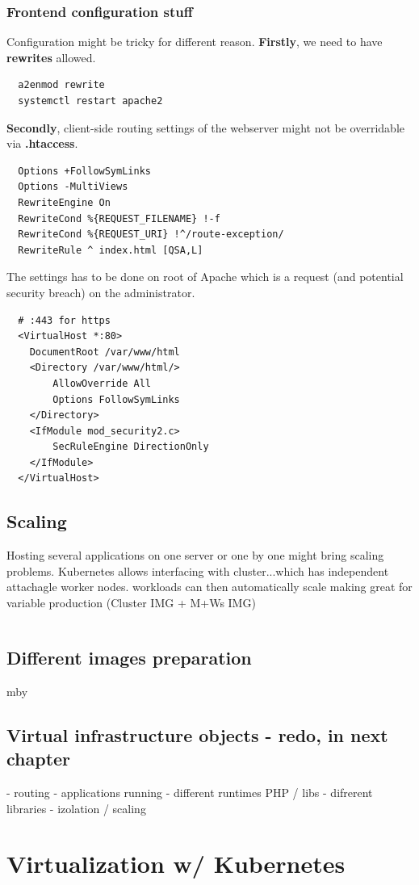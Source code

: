 \documentclass{article}
\begin{document}
\subsubsection{Frontend configuration stuff}
Configuration might be tricky for different reason. \textbf{Firstly}, we need to have \textbf{rewrites} allowed.
\begin{lstlisting}
  a2enmod rewrite
  systemctl restart apache2
\end{lstlisting}
\textbf{Secondly}, client-side routing settings of the webserver might not be overridable via \textbf{.htaccess}.  
\begin{lstlisting}
  Options +FollowSymLinks
  Options -MultiViews
  RewriteEngine On
  RewriteCond %{REQUEST_FILENAME} !-f
  RewriteCond %{REQUEST_URI} !^/route-exception/
  RewriteRule ^ index.html [QSA,L]
\end{lstlisting}
The settings has to be done on root of Apache which is a request (and potential security breach) on the administrator.
\begin{lstlisting}
  # :443 for https
  <VirtualHost *:80>
    DocumentRoot /var/www/html
    <Directory /var/www/html/>
        AllowOverride All
        Options FollowSymLinks
    </Directory>
    <IfModule mod_security2.c>
        SecRuleEngine DirectionOnly
    </IfModule>
  </VirtualHost>	
\end{lstlisting}
\subsection{Scaling}
Hosting several applications on one server or one by one might bring scaling problems. Kubernetes allows interfacing with cluster...which has independent attachagle worker nodes. workloads can then automatically scale making great for variable production (Cluster IMG + M+Ws IMG)
\begin{lstlisting}

\end{lstlisting}
\subsection{Different images preparation}
mby
\subsection{Virtual infrastructure objects - redo, in next chapter}
- routing
- applications running
- different runtimes PHP / libs
- difrerent libraries
- izolation / scaling
\section{Virtualization w/ Kubernetes}
\end{document}
